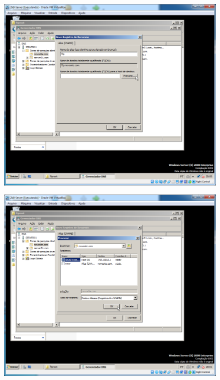 \documentclass[10pt]{article}
\begin{document}
\begin{figure}[H]
    \centering
    \caption{}
    \label{fig:5417}
    \includegraphics[width=\linewidth]{images/windows_server/ftp/010.png}
\end{figure}
\begin{figure}[H]
    \centering
    \caption{}
    \label{fig:5418}
    \includegraphics[width=\linewidth]{images/windows_server/ftp/014.png}
\end{figure}
\end{document}
